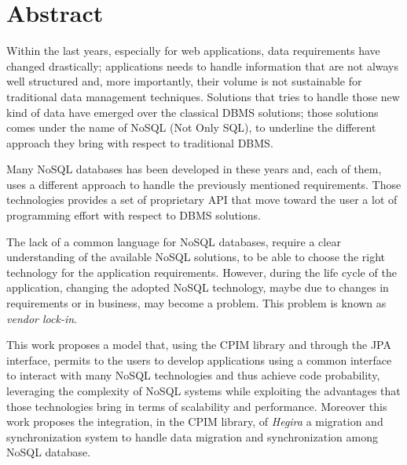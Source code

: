 \thispagestyle{empty}

\chapter*{Abstract}
Within the last years, especially for web applications, data requirements have changed drastically; applications needs to handle information that are not always well structured and, more importantly, their volume is not sustainable for traditional data management techniques. Solutions that tries to handle those new kind of data have emerged over the classical DBMS solutions; those solutions comes under the name of NoSQL (Not Only SQL), to underline the different approach they bring with respect to traditional  DBMS.

\noindent Many NoSQL databases has been developed in these years and, each of them, uses a different approach to handle the previously mentioned requirements. Those technologies provides a set of proprietary API that move toward the user a lot of programming effort with respect to DBMS solutions. 

\noindent The lack of a common language for NoSQL databases, require a clear understanding of the available NoSQL solutions, to be able to choose the right technology for the application requirements. However, during the life cycle of the application, changing the adopted NoSQL technology, maybe due to changes in requirements or in business, may become a problem. This problem is known as \textit{vendor lock-in}.    

\noindent This work proposes a model that, using the CPIM library and through the JPA interface, permits to the users to develop applications using a common interface to interact with many NoSQL technologies and thus achieve code probability, leveraging the complexity of NoSQL systems while exploiting the advantages that those technologies bring in terms of scalability and performance. Moreover this work proposes the integration, in the CPIM library, of \textit{Hegira} a migration and synchronization system to handle data migration and synchronization among NoSQL database.

\cleardoublepage

\thispagestyle{empty}

